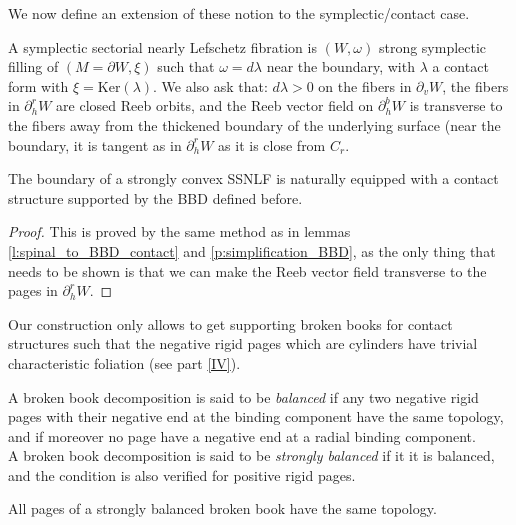 \documentclass[../main.tex]{subfiles}
\begin{document}
We now define an extension of these notion to the symplectic/contact case. 

\begin{definition}
A symplectic sectorial nearly Lefschetz fibration is $(W,\omega)$ strong symplectic filling of $(M=\partial W,\xi )$ such that $\omega = d\lambda$ near the boundary, with $\lambda$ a contact form with $\xi = \text{Ker}(\lambda)$. We also ask that: $d\lambda >0 $ on the fibers in $\partial_v W$, the fibers in $\partial_h^r W$ are closed Reeb orbits, and the Reeb vector field on $\partial_h^bW$ is transverse to the fibers away from the thickened boundary of the underlying surface (near the boundary, it is tangent as in $\partial_h^rW$ as it is close from $C_r$.
\end{definition}

\begin{lemma}
    The boundary of a strongly convex SSNLF is naturally equipped with a contact structure supported by the BBD defined before.
\end{lemma}

\begin{proof}
This is proved by the same method as in lemmas \ref{l:spinal_to_BBD_contact} and \ref{p:simplification_BBD}, as the only thing that needs to be shown is that we can make the Reeb vector field transverse to the pages in $\partial_h^r W$.
\end{proof}

\begin{remark}
Our construction only allows to get supporting broken books for contact structures such that the negative rigid pages which are cylinders have trivial characteristic foliation (see part \ref{IV}).
\end{remark}

\begin{definition}
A broken book decomposition is said to be \textit{balanced} if any two negative rigid pages with their negative end at the binding component have the same topology, and if moreover no page have a negative end at a radial binding component.\\
A broken book decomposition is said to be \textit{strongly balanced} if it it is balanced, and the condition is also verified for positive rigid pages. 
\end{definition}

\begin{lemma}
All pages of a strongly balanced broken book have the same topology. 
\end{lemma}
\end{document}

